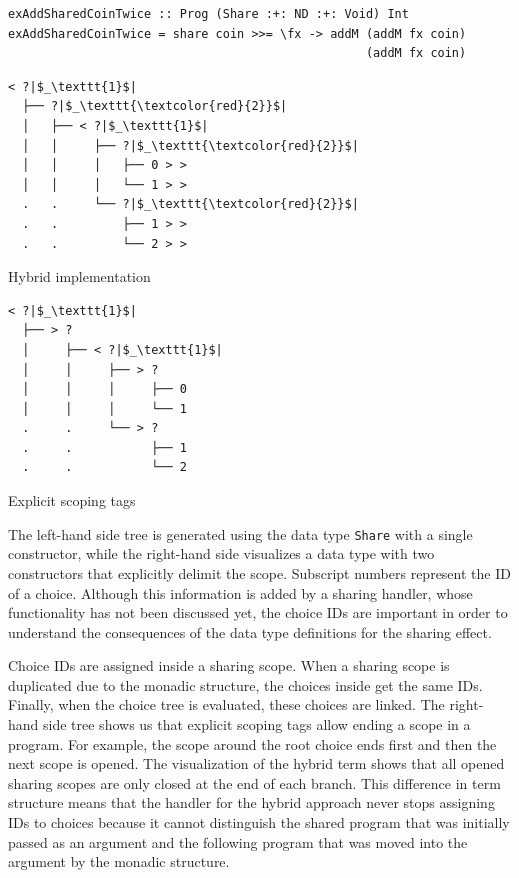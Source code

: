 \documentclass[a4paper, 11pt, fleqn, twoside, abstract=on]{scrreprt}
\newcommand{\hinl}[1]{\texttt{#1}}
\begin{document}
\begin{verbatim}
exAddSharedCoinTwice :: Prog (Share :+: ND :+: Void) Int
exAddSharedCoinTwice = share coin >>= \fx -> addM (addM fx coin) 
                                                  (addM fx coin)
\end{verbatim}

\vspace{0.32cm}

\begin{minipage}{.4 \linewidth}
\begin{verbatim}
< ?|$_\texttt{1}$|
  ├── ?|$_\texttt{\textcolor{red}{2}}$|
  │   ├── < ?|$_\texttt{1}$|
  │   │     ├── ?|$_\texttt{\textcolor{red}{2}}$|
  │   │     │   ├── 0 > >
  │   │     │   └── 1 > >
  .   .     └── ?|$_\texttt{\textcolor{red}{2}}$|
  .   .         ├── 1 > >
  .   .         └── 2 > >
\end{verbatim}
\begin{center}
Hybrid implementation
\end{center}
\end{minipage}
\hspace{.1 \linewidth}
\vline
\hspace{.1 \linewidth}
\begin{minipage}{.475 \linewidth}
\begin{verbatim}
< ?|$_\texttt{1}$|
  ├── > ? 
  │     ├── < ?|$_\texttt{1}$|
  │     │     ├── > ? 
  │     │     │     ├── 0
  │     │     │     └── 1
  .     .     └── > ? 
  .     .           ├── 1
  .     .           └── 2
\end{verbatim}
Explicit scoping tags
\end{minipage}

\vspace{0.32cm}

The left-hand side tree is generated using the data type \hinl{Share} with a single constructor, while the right-hand side visualizes a data type with two constructors that explicitly delimit the scope.
Subscript numbers represent the ID of a choice.
Although this information is added by a sharing handler, whose functionality has not been discussed yet, the choice IDs are important in order to understand the consequences of the data type definitions for the sharing effect.

Choice IDs are assigned inside a sharing scope.
When a sharing scope is duplicated due to the monadic structure, the choices inside get the same IDs.
Finally, when the choice tree is evaluated, these choices are linked.
The right-hand side tree shows us that explicit scoping tags allow ending a scope in a program.
For example, the scope around the root choice ends first and then the next scope is opened.
The visualization of the hybrid term shows that all opened sharing scopes are only closed at the end of each branch.
This difference in term structure means that the handler for the hybrid approach never stops assigning IDs to choices because it cannot distinguish the shared program that was initially passed as an argument and the following program that was moved into the argument by the monadic structure.
\end{document}
